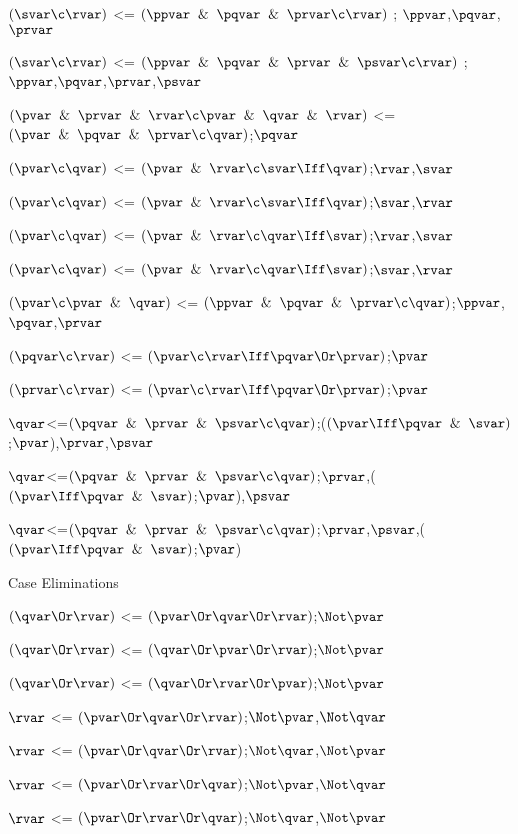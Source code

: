 $(\svar \c \rvar)$ <= $(\ppvar \And \pqvar \And \prvar \c \rvar)$ ; $\ppvar$,$\pqvar$,$\prvar$

$(\svar \c \rvar)$ <= $(\ppvar \And \pqvar \And \prvar \And \psvar \c \rvar)$ ; $\ppvar$,$\pqvar$,$\prvar$,$\psvar$

$(\pvar \And \prvar \And \rvar \c \pvar \And \qvar \And \rvar)$ <= $(\pvar \And \pqvar \And \prvar\c \qvar)$;$\pqvar$

$(\pvar \c \qvar)$ <= $(\pvar \And \rvar \c \svar \Iff \qvar)$;$\rvar$,$\svar$

$(\pvar \c \qvar)$ <= $(\pvar \And \rvar \c \svar \Iff \qvar)$;$\svar$,$\rvar$

$(\pvar \c \qvar)$ <= $(\pvar \And \rvar \c \qvar \Iff \svar)$;$\rvar$,$\svar$

$(\pvar \c \qvar)$ <= $(\pvar \And \rvar \c \qvar \Iff \svar)$;$\svar$,$\rvar$

$(\pvar  \c \pvar \And \qvar)$ <= $(\ppvar \And \pqvar \And \prvar\c\qvar)$;$\ppvar$,$\pqvar$,$\prvar$

$(\pqvar \c \rvar )$ <= $(\pvar  \c \rvar \Iff \pqvar \Or \prvar )$;$\pvar$

$(\prvar \c \rvar )$ <= $(\pvar  \c \rvar \Iff \pqvar \Or \prvar )$;$\pvar$

$\qvar$<=$(\pqvar \And \prvar \And \psvar \c \qvar)$;($(\pvar \Iff \pqvar \And \svar)$;$\pvar$),$\prvar$,$\psvar$

$\qvar$<=$(\pqvar \And \prvar \And \psvar \c \qvar)$;$\prvar$,($(\pvar \Iff \pqvar \And \svar)$;$\pvar$),$\psvar$

$\qvar$<=$(\pqvar \And \prvar \And \psvar \c \qvar)$;$\prvar$,$\psvar$,($(\pvar \Iff \pqvar \And \svar)$;$\pvar$)

\lineb

Case Eliminations

$(\qvar \Or \rvar)$ <= $(\pvar \Or \qvar \Or\rvar)$;$\Not \pvar$

$(\qvar \Or \rvar)$ <= $(\qvar \Or \pvar \Or\rvar)$;$\Not \pvar$

$(\qvar \Or \rvar)$ <= $(\qvar \Or \rvar \Or\pvar)$;$\Not \pvar$

$\rvar$ <= $(\pvar \Or \qvar \Or\rvar)$;$\Not \pvar$,$\Not \qvar$

$\rvar$ <= $(\pvar \Or \qvar \Or\rvar)$;$\Not \qvar$,$\Not \pvar$

$\rvar$ <= $(\pvar \Or \rvar \Or\qvar)$;$\Not \pvar$,$\Not \qvar$

$\rvar$ <= $(\pvar \Or \rvar \Or\qvar)$;$\Not \qvar$,$\Not \pvar$

